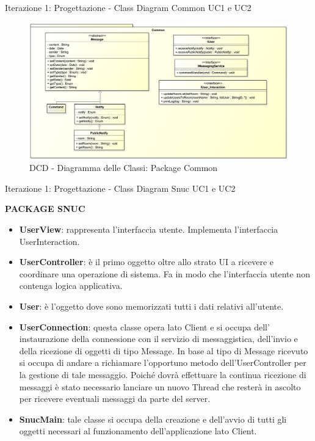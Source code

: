 \begin{frame} {Iterazione 1: Progettazione - Class Diagram Common UC1 e UC2}
   \begin{figure}
     \includegraphics[scale=0.165]{image_astah/Iteration_1_DesignModel/ClassDiagramCommon.png}{\centering}
     \caption{DCD - Diagramma delle Classi: Package Common }
     \label{fig_UC1_UC2_DCD_1} 
   \end{figure}
\end{frame}

\begin{frame} [allowframebreaks] {Iterazione 1: Progettazione - Class Diagram Snuc UC1 e UC2}
  \centerline{\textbf{PACKAGE SNUC}}
  \begin{itemize}
   \item \textbf{UserView}: rappresenta l'interfaccia utente. Implementa l'interfaccia UserInteraction.
   \item \textbf{UserController}: è il primo oggetto oltre allo strato UI a ricevere e coordinare una operazione di sistema. Fa in modo che l'interfaccia utente non 
         contenga logica applicativa.
   \item \textbf{User}: è l'oggetto dove sono memorizzati tutti i dati relativi all'utente.
   \item \textbf{UserConnection}: questa classe opera lato Client e si occupa dell' instaurazione della connessione con il servizio di messaggistica, dell'invio e 
         della ricezione di oggetti di tipo Message. In base al tipo di Message ricevuto si occupa di andare a richiamare l'opportuno metodo dell'UserController per 
         la gestione di tale messaggio. Poiché dovrà effettuare la continua ricezione di messaggi è stato necessario lanciare un nuovo Thread che resterà in ascolto 
         per ricevere eventuali messaggi da parte del server.
   \item \textbf{SnucMain}: tale classe si occupa della creazione e dell'avvio di tutti gli oggetti necessari al funzionamento dell'applicazione lato Client.
  \end{itemize} 
 \end{frame}

